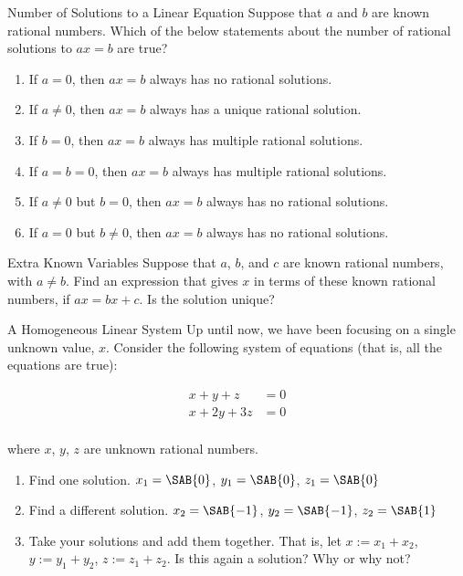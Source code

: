 \documentclass[12pt,letterpaper]{article}
\begin{document}
\begin{problem}{Number of Solutions to a Linear Equation}
  Suppose that \(a\) and \(b\) are known rational numbers. Which of the below statements
  about the number of rational solutions to \(ax = b\) are true?

  \begin{enumerate}
    \item If \(a=0\), then \(ax = b\) always has no rational solutions.
    \hfill \TFFalse
    \item If \(a\ne 0\), then \(ax = b\) always has a unique rational solution.
    \hfill \TFTrue
    \item If \(b=0\), then \(ax = b\) always has multiple rational solutions.
    \hfill \TFFalse
    \item If \(a=b=0\), then \(ax = b\) always has multiple rational solutions.
    \hfill \TFTrue
    \item If \(a\ne0\) but \(b=0\), then \(ax = b\) always has no rational solutions.
    \hfill \TFFalse
    \item If \(a=0\) but \(b\ne0\), then \(ax = b\) always has no rational solutions.
    \hfill \TFTrue
  \end{enumerate}
\end{problem}

\begin{problem}{Extra Known Variables}
  Suppose that \(a\), \(b\), and \(c\) are known rational numbers, with \(a \ne b\). Find an
  expression that gives \(x\) in terms of these known rational numbers, if \(ax = bx + c\).
  Is the solution unique?
\end{problem}

\begin{problem}{A Homogeneous Linear System}
  Up until now, we have been focusing on a single unknown value, \(x\). Consider the
  following system of equations (that is, all the equations are true):

  \begin{align*}
    x + y + z &= 0 \\
    x + 2y + 3z &= 0 \\
  \end{align*}

  where \(x\), \(y\), \(z\) are unknown rational numbers.


  \begin{enumerate}
    \item Find one solution. \hfill \(x_1 = \SAB{0}\), \(y_1 = \SAB{0}\), \(z_1 = \SAB{0}\)
    \item Find a different solution. \hfill \(x_2 = \SAB{-1}\), \(y_2 = \SAB{-1}\), \(z_2 = \SAB{1}\)
    \item Take your solutions and add them together. That is, let \(x := x_1 + x_2\), \(y :=
    y_1 + y_2\), \(z := z_1 + z_2\). Is this again a solution? Why or why not?
  \end{enumerate}
\end{problem}
\end{document}
